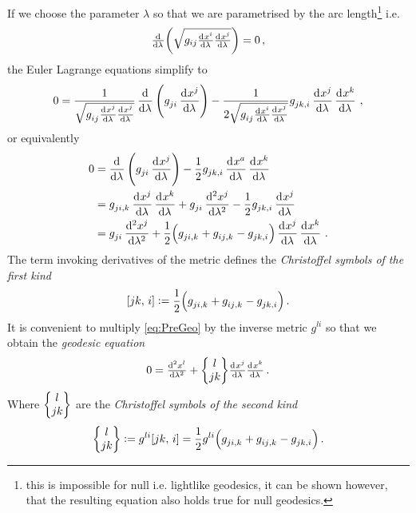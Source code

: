 If we choose the parameter $\lambda$ so that we are parametrised by the arc
length\footnote{this is impossible for null i.e. lightlike geodesics, it can be
shown however, that the resulting equation also holds true for null geodesics.}
i.e.
\begin{equation}
\od{}{\lambda}\left(\sqrt{g_{ij}\od{x^i}{\lambda}\od{x^j}{\lambda}}\right)=0\,,
\end{equation}
the Euler Lagrange equations simplify to
\begin{equation}
0=\frac{1}{\sqrt{\tensor{g}{_i_j}\od{\tensor{x}{^j}}{\lambda}
\od{\tensor{x}{^j}}{\lambda}}}\dod{}{\lambda}
\left(\tensor{g}{_j_i}\dod{\tensor{x}{^j}}{\lambda}\right)
-\frac{1}{2\sqrt{\tensor{g}{_i_j}\od{x^i}{\lambda}
\od{\tensor{x}{^j}}{\lambda}}}\tensor{g}{_j_k_{,i}}\dod{\tensor{x}{^j}}{\lambda}
\dod{\tensor{x}{^k}}{\lambda}\,,
\end{equation}
or equivalently
\begin{equation}
\begin{split}
0
&=\dod{}{\lambda}\left(\tensor{g}{_j_i}\dod{\tensor{x}{^j}}{\lambda}\right)
-\frac{1}{2}\tensor{g}{_j_k_{,i}}\dod{x^a}{\lambda}
\dod{x^k}{\lambda}\\
&=\tensor{g}{_j_i_{,k}}\dod{\tensor{x}{^j}}{\lambda}\dod{\tensor{x}{^k}}{\lambda}
+\tensor{g}{_j_i}\dod[2]{\tensor{x}{^j}}{\lambda}
-\frac{1}{2}\tensor{g}{_j_k_{,i}}\dod{\tensor{x}{^j}}{\lambda}\\
&=\tensor{g}{_j_i}\dod[2]{\tensor{x}{^j}}{\lambda}
+\frac{1}{2}\left(\tensor{g}{_j_i_{,k}}+\tensor{g}{_i_j_{,k}}
-\tensor{g}{_j_k_{,i}}\right)\dod{\tensor{x}{^j}}{\lambda}
\dod{\tensor{x}{^k}}{\lambda}\label{eq:PreGeo}\,.
\end{split}
\end{equation}
The term invoking derivatives of the metric defines the \emph{Christoffel
symbols of the first kind}
\begin{equation}
    \csym{j}{k}{i}:=\frac{1}{2}
    \left(\tensor{g}{_j_i_{,k}}+\tensor{g}{_i_j_{,k}} -\tensor{g}{_j_k_{,i}}\right)\, .
\end{equation}
It is convenient to multiply \eqref{eq:PreGeo} by the inverse metric $g^{li}$ so
that we obtain the \emph{geodesic equation}
\begin{equation}
    0 =
    \od[2]{\tensor{x}{^l}}{\lambda}
    +\cSym{l}{j}{k}\od{\tensor{x}{^j}}{\lambda}\od{\tensor{x}{^k}}{\lambda}\,
    .\label{eq:geodeq}
\end{equation}
Where $\begin{Bmatrix} l \\ j k \end{Bmatrix}$ are the \emph{Christoffel symbols of the second kind}
\begin{equation}
    \cSym{l}{j}{k}:=g^{li}\csym{j}{k}{i}=\frac{1}{2}g^{li}
    \left(\tensor{g}{_j_i_{,k}}+\tensor{g}{_i_j_{,k}} -\tensor{g}{_j_k_{,i}}\right)\, .
\end{equation}
